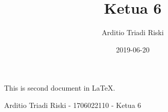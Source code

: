 \documentclass{article}
\title{Ketua 6}
\date{2019-06-20}
\author{Arditio Triadi Riski}
\begin{document}
  \maketitle
  \newpage

  This is second document in \LaTeX.  
  
  Arditio Triadi Riski - 1706022110 - Ketua 6
\end{document}
